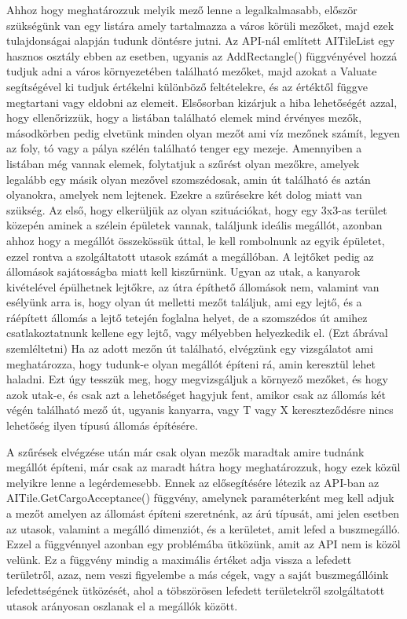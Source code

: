 Ahhoz hogy meghatározzuk melyik mező lenne a legalkalmasabb, először szükségünk van egy listára amely tartalmazza a város körüli mezőket, majd ezek tulajdonságai alapján tudunk döntésre jutni. Az API-nál említett AITileList egy hasznos osztály ebben az esetben, ugyanis az AddRectangle() függvényével hozzá tudjuk adni a város környezetében található mezőket, majd azokat a Valuate segítségével ki tudjuk értékelni különböző feltételekre, és az értéktől függve megtartani vagy eldobni az elemeit. Elsősorban kizárjuk a hiba lehetőségét azzal, hogy ellenőrizzük, hogy a listában található elemek mind érvényes mezők, másodkörben pedig elvetünk minden olyan mezőt ami víz mezőnek számít, legyen az foly, tó vagy a pálya szélén található tenger egy mezeje.
Amennyiben a listában még vannak elemek, folytatjuk a szűrést olyan mezőkre, amelyek legalább egy másik olyan mezővel szomszédosak, amin út található és aztán olyanokra, amelyek nem lejtenek. Ezekre a szűrésekre két dolog miatt van szükség. Az első, hogy elkerüljük az olyan szituációkat, hogy egy 3x3-as terület közepén aminek a szélein épületek vannak, találjunk ideális megállót, azonban ahhoz hogy a megállót összekössük úttal, le kell rombolnunk az egyik épületet, ezzel rontva a szolgáltatott utasok számát a megállóban. A lejtőket pedig az állomások sajátosságba miatt kell kiszűrnünk. Ugyan az utak, a kanyarok kivételével épülhetnek lejtőkre, az útra építhető állomások nem, valamint van esélyünk arra is, hogy olyan út melletti mezőt találjuk, ami egy lejtő, és a ráépített állomás a lejtő tetején foglalna helyet, de a szomszédos út amihez csatlakoztatnunk kellene egy lejtő, vagy mélyebben helyezkedik el. (Ezt ábrával szemléltetni) Ha az adott mezőn út található, elvégzünk egy vizsgálatot ami meghatározza, hogy tudunk-e olyan megállót építeni rá, amin keresztül lehet haladni. Ezt úgy tesszük meg, hogy megvizsgáljuk a környező mezőket, és hogy azok utak-e, és csak azt a lehetőséget hagyjuk fent, amikor csak az állomás két végén található mező út, ugyanis kanyarra, vagy T vagy X kereszteződésre nincs lehetőség ilyen típusú állomás építésére.

A szűrések elvégzése után már csak olyan mezők maradtak amire tudnánk megállót építeni, már csak az maradt hátra hogy meghatározzuk, hogy ezek közül melyikre lenne a legérdemesebb. Ennek az elősegítésére létezik az API-ban az AITile.GetCargoAcceptance() függvény, amelynek paraméterként meg kell adjuk a mezőt amelyen az állomást építeni szeretnénk, az árú típusát, ami jelen esetben az utasok, valamint a megálló dimenziót, és a kerületet, amit lefed a buszmegálló. Ezzel a függvénnyel azonban egy problémába ütközünk, amit az API nem is közöl velünk. Ez a függvény mindig a maximális értéket adja vissza a lefedett területről, azaz, nem veszi figyelembe a más cégek, vagy a saját buszmegállóink lefedettségének ütközését, ahol a töbszörösen lefedett területekről szolgáltatott utasok arányosan oszlanak el a megállók között.

